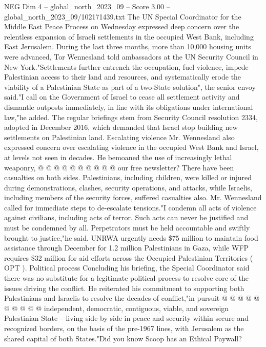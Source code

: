 \begin{textsample}{NEG Dim 4 – global\_north\_2023\_09 – Score 3.00 – global\_north\_2023\_09/102171439.txt}  \label{ex:f4_neg_050}
The UN Special Coordinator for the Middle East Peace Process on Wednesday expressed deep concern over the relentless expansion of Israeli settlements in the occupied West Bank, including East Jerusalem.
During the last three months, more than 10,000 housing units were advanced, Tor Wennesland told ambassadors at the UN Security Council in New York."Settlements further entrench the occupation, fuel violence, impede Palestinian access to their land and resources, and systematically erode the viability of a Palestinian State as part of a two-State solution", the senior envoy said."I call on the Government of Israel to cease all settlement activity and dismantle outposts immediately, in line with its obligations under international law,"he added.
The regular briefings stem from Security Council resolution 2334, adopted in December 2016, which demanded that Israel stop building new settlements on Palestinian land.
Escalating violence Mr.
Wennesland also expressed concern over escalating violence in the occupied West Bank and Israel, at levels not seen in decades.
He bemoaned the use of increasingly lethal weaponry, @ @ @ @ @ @ @ @ @ @ our free newsletter?
There have been casualties on both sides.
Palestinians, including children, were killed or injured during demonstrations, clashes, security operations, and attacks, while Israelis, including members of the security forces, suffered casualties also.
Mr.
Wennesland called for immediate steps to de-escalate tensions."I condemn all acts of violence against civilians, including acts of terror.
Such acts can never be justified and must be condemned by all.
Perpetrators must be held accountable and swiftly brought to justice,"he said.
UNRWA urgently needs \$75 million to maintain food assistance through December for 1.2 million Palestinians in Gaza, while WFP requires \$32 million for aid efforts across the Occupied Palestinian Territories ( OPT ).
Political process Concluding his briefing, the Special Coordinator said there was no substitute for a legitimate political process to resolve core of the issues driving the conflict.
He reiterated his commitment to supporting both Palestinians and Israelis to resolve the decades of conflict,"in pursuit @ @ @ @ @ @ @ @ @ @ independent, democratic, contiguous, viable, and sovereign Palestinian State -- living side by side in peace and security within secure and recognized borders, on the basis of the pre-1967 lines, with Jerusalem as the shared capital of both States."Did you know Scoop has an Ethical Paywall?

\end{textsample}

